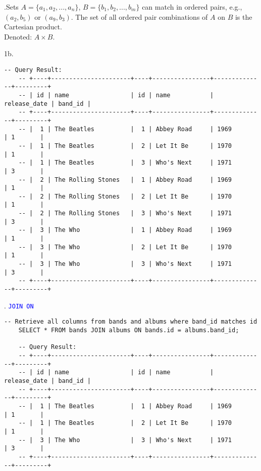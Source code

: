 \begin{Def}
    .Sets $A=\{a_1,a_2,...,a_n\}$, $B=\{b_1,b_2,...,b_m\}$ can match in ordered pairs, e.g.,\\
    $(a_2,b_5)$ or $(a_9, b_3)$. The set of all ordered pair combinations of $A$ on $B$ is the Cartesian product.\\

    \noindent
    Denoted: $A\times B$.
\end{Def}
1b.
\begin{lstlisting}[style=sql]
    -- Query Result:
    -- +----+----------------------+----+----------------+--------------+---------+
    -- | id | name                 | id | name           | release_date | band_id |
    -- +----+----------------------+----+----------------+--------------+---------+
    -- |  1 | The Beatles          |  1 | Abbey Road     | 1969         | 1       |
    -- |  1 | The Beatles          |  2 | Let It Be      | 1970         | 1       |
    -- |  1 | The Beatles          |  3 | Who's Next     | 1971         | 3       |
    -- |  2 | The Rolling Stones   |  1 | Abbey Road     | 1969         | 1       |
    -- |  2 | The Rolling Stones   |  2 | Let It Be      | 1970         | 1       |
    -- |  2 | The Rolling Stones   |  3 | Who's Next     | 1971         | 3       |
    -- |  3 | The Who              |  1 | Abbey Road     | 1969         | 1       |
    -- |  3 | The Who              |  2 | Let It Be      | 1970         | 1       |
    -- |  3 | The Who              |  3 | Who's Next     | 1971         | 3       |
    -- +----+----------------------+----+----------------+--------------+---------+
\end{lstlisting}
\newpage

. \textcolor{blue}{\texttt{JOIN ON}}

\begin{lstlisting}[style=sql]
    -- Retrieve all columns from bands and albums where band_id matches id
    SELECT * FROM bands JOIN albums ON bands.id = albums.band_id;

    -- Query Result:
    -- +----+----------------------+----+----------------+--------------+---------+
    -- | id | name                 | id | name           | release_date | band_id |
    -- +----+----------------------+----+----------------+--------------+---------+
    -- |  1 | The Beatles          |  1 | Abbey Road     | 1969         | 1       |
    -- |  1 | The Beatles          |  2 | Let It Be      | 1970         | 1       |
    -- |  3 | The Who              |  3 | Who's Next     | 1971         | 3       |
    -- +----+----------------------+----+----------------+--------------+---------+
\end{lstlisting}

